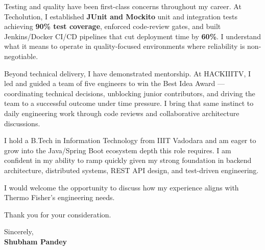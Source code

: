 \documentclass[a4paper,11pt]{article}
\begin{document}
Testing and quality have been first-class concerns throughout my career. At Techolution, I established \textbf{JUnit and Mockito} unit and integration tests achieving \textbf{90\% test coverage}, enforced code-review gates, and built Jenkins/Docker CI/CD pipelines that cut deployment time by \textbf{60\%}. I understand what it means to operate in quality-focused environments where reliability is non-negotiable.

Beyond technical delivery, I have demonstrated mentorship. At HACKIIITV, I led and guided a team of five engineers to win the Best Idea Award --- coordinating technical decisions, unblocking junior contributors, and driving the team to a successful outcome under time pressure. I bring that same instinct to daily engineering work through code reviews and collaborative architecture discussions.

I hold a B.Tech in Information Technology from IIIT Vadodara and am eager to grow into the Java/Spring Boot ecosystem depth this role requires. I am confident in my ability to ramp quickly given my strong foundation in backend architecture, distributed systems, REST API design, and test-driven engineering.

I would welcome the opportunity to discuss how my experience aligns with Thermo Fisher's engineering needs.

\vspace{6pt}

Thank you for your consideration.

\vspace{18pt}

Sincerely,\\
\textbf{Shubham Pandey}
\end{document}
